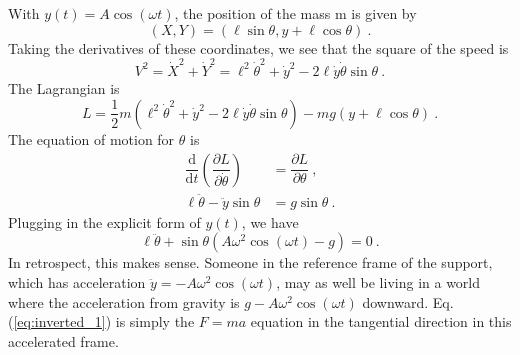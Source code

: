 \documentclass[11pt,a4paper]{article}
\newcommand{\dif}{\mathrm{d}}
\begin{document}
With $y(t) = A \cos(\omega t)$, the position of the mass m is given by 
\begin{equation}
(X, Y ) = (\ell \sin \theta, y + \ell \cos \theta) ~.
\end{equation}
Taking the derivatives of these coordinates, we see that the square of the speed is
\begin{equation}
V^2 = \dot{X}^2 + \dot{Y}^2 = \ell^2 \dot{\theta}^2 +\dot{y}^2 - 2 \ell \dot{y} \dot{\theta} \sin \theta ~.
\end{equation}
The Lagrangian is
\begin{equation}
L= \dfrac{1}{2} m( \ell^2 \dot{\theta}^2 + \dot{y}^2 - 2 \ell \dot{y} \dot{\theta} \sin \theta) -mg(y+\ell \cos \theta) ~. 
\end{equation}
The equation of motion for $\theta$ is
\begin{align}
\dfrac{\dif }{\dif t} \left(\dfrac{\partial L}{\partial \dot{\theta}} \right) &= \dfrac{\partial L}{\partial \theta} ~, \\
\ell \ddot{\theta} - \ddot{y} \sin \theta &= g \sin \theta ~.
\end{align}
Plugging in the explicit form of $y(t)$, we have
\begin{equation}
\ell \ddot{\theta} +\sin \theta \left( A\omega^2 \cos(\omega t) - g \right) = 0 ~.
\label{eq:inverted_1}
\end{equation}
In retrospect, this makes sense. Someone in the reference frame of the support, which has acceleration $\ddot{y} = -A \omega^2 \cos(\omega t)$, may as well be living in a world where the acceleration from gravity is $g - A \omega^2 \cos(\omega t)$ downward. Eq. (\ref{eq:inverted_1}) is simply the $F = ma$ equation in the tangential direction in this accelerated frame.
 
\end{document}
